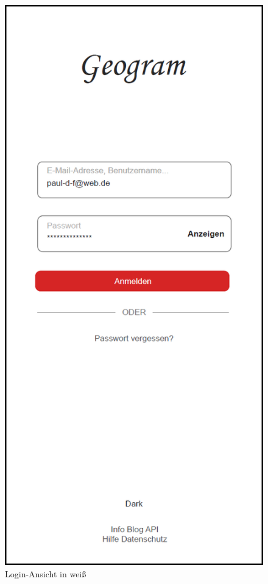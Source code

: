 \begin{figure}[H]
    \centering
    \begin{minipage}{.5\textwidth}
      \centering
      \includegraphics[width=.6\linewidth]{images/Login_MockUp.png}
      \caption{Login-Ansicht in weiß}
      \label{fig:login_white}
    \end{minipage}%
    \begin{minipage}{.5\textwidth}
      \centering

\end{minipage}
\end{figure}
